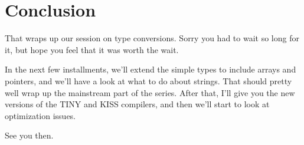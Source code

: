 \documentclass[float=false, crop=false]{standalone}
\begin{document}
\section{Conclusion}

That wraps up our session on type conversions. Sorry you had to wait so long for
it, but hope you feel that it was worth the wait.

In the next few installments, we'll extend the simple types to include arrays
and pointers, and we'll have a look at what to do about strings. That should
pretty well wrap up the mainstream part of the series. After that, I'll give you
the new versions of the TINY and KISS compilers, and then we'll start to look at
optimization issues.

See you then.
\end{document}
